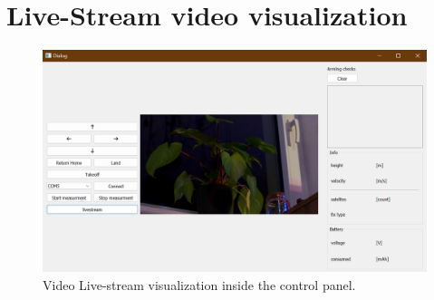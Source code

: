 \newpage

\section{Live-Stream video visualization}
\label{sec:appendix_livestream}
\begin{figure}[htpb]
    \centering
    \includegraphics[scale=0.5]{drone_control_panel_live_stream.png}
    \caption[Video Live-stream visualization]{Video Live-stream visualization
    inside the control panel.}
    \label{fig:4_control_panel_live_stream}
\end{figure}
